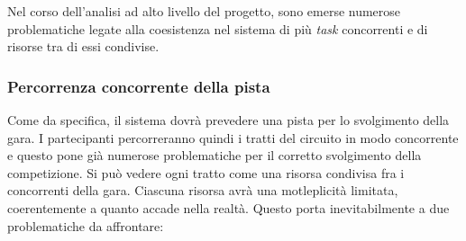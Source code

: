 \label{problematiche_concorrenza}
Nel corso dell'analisi ad alto livello del progetto, sono emerse numerose problematiche legate alla coesistenza nel 
sistema di pi\`{u} \emph{task} concorrenti e di risorse tra di essi condivise. \\
\subsubsection{Percorrenza concorrente della pista}
Come da specifica, il sistema dovr\`{a} prevedere una pista per lo svolgimento della gara. I partecipanti percorreranno quindi i tratti del circuito in modo concorrente e questo pone gi\`{a} numerose problematiche per il corretto svolgimento della competizione.
Si pu\`{o} vedere ogni tratto come una risorsa condivisa fra i concorrenti della gara. Ciascuna risorsa avr\`{a} una motleplicit\`{a} limitata, coerentemente a quanto accade nella realt\`{a}. Questo porta inevitabilmente a due problematiche da affrontare:
